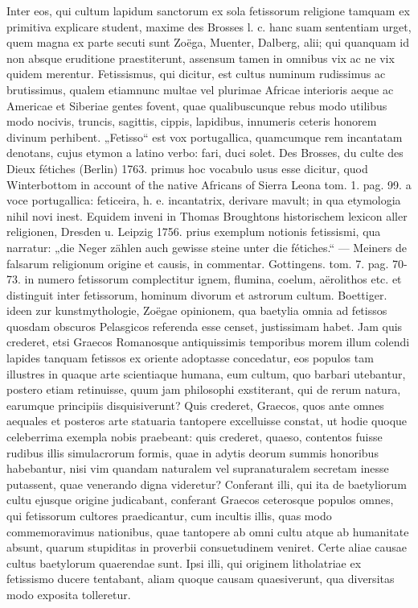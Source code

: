 \documentclass[a4paper, 11pt, oneside, polutonikogreek, german]{article}
\begin{document}
Inter eos, qui cultum lapidum sanctorum ex sola fetissorum religione tamquam ex primitiva explicare student, maxime des Brosses l. c. hanc suam sententiam urget, quem magna ex parte secuti sunt Zoëga, Muenter, Dalberg, alii; qui quanquam id non absque eruditione praestiterunt, assensum tamen in omnibus vix ac ne vix quidem merentur. Fetissismus, qui dicitur, est cultus numinum rudissimus ac brutissimus, qualem etiamnunc multae vel plurimae Africae interioris aeque ac Americae et Siberiae gentes fovent, quae qualibuscunque rebus modo utilibus modo nocivis, truncis, sagittis, cippis, lapidibus, innumeris ceteris honorem divinum perhibent. „Fetisso“ est vox portugallica, quamcumque rem incantatam denotans, cujus etymon a latino verbo: fari, duci solet. Des Brosses, du culte des Dieux fétiches (Berlin) 1763. primus hoc vocabulo usus esse dicitur, quod Winterbottom in account of the native Africans of Sierra Leona tom. 1. pag. 99. a voce portugallica: feticeira, h. e. incantatrix, derivare mavult; in qua etymologia nihil novi inest. Equidem inveni in Thomas Broughtons historischem lexicon aller religionen, Dresden u. Leipzig 1756. prius exemplum notionis fetissismi, qua narratur: „die Neger zählen auch gewisse steine unter die fétiches.“ --- Meiners de falsarum religionum origine et causis, in commentar. Gottingens. tom. 7. pag. 70-73. in numero fetissorum complectitur ignem, flumina, coelum, aërolithos etc. et distinguit inter fetissorum, hominum divorum et astrorum cultum. Boettiger. ideen zur kunstmythologie, Zoëgae opinionem, qua baetylia omnia ad fetissos quosdam obscuros Pelasgicos referenda esse censet, justissimam habet. Jam quis crederet, etsi Graecos Romanosque antiquissimis temporibus morem illum colendi lapides tanquam fetissos ex oriente adoptasse concedatur, eos populos tam illustres in quaque arte scientiaque humana, eum cultum, quo barbari utebantur, postero etiam retinuisse, quum jam philosophi exstiterant, qui de rerum natura, earumque principiis disquisiverunt? Quis crederet, Graecos, quos ante omnes aequales et posteros arte statuaria tantopere excelluisse constat, ut hodie quoque celeberrima exempla nobis praebeant: quis crederet, quaeso, contentos fuisse rudibus illis simulacrorum formis, quae in adytis deorum summis honoribus habebantur, nisi vim quandam naturalem vel supranaturalem secretam inesse putassent, quae venerando digna videretur? Conferant illi, qui ita de baetyliorum cultu ejusque origine judicabant, conferant Graecos ceterosque populos omnes, qui fetissorum cultores praedicantur, cum incultis illis, quas modo commemoravimus nationibus, quae tantopere ab omni cultu atque ab humanitate absunt, quarum stupiditas in proverbii consuetudinem veniret. Certe aliae causae cultus baetylorum quaerendae sunt. Ipsi illi, qui originem litholatriae ex fetissismo ducere tentabant, aliam quoque causam quaesiverunt, qua diversitas modo exposita tolleretur.
\end{document}

